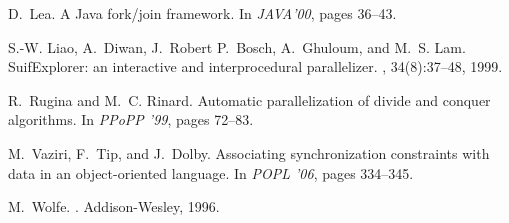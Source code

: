 \documentclass[10pt,twocolumn]{article}
\begin{document}
\begin{thebibliography}{10}
D.~Lea.
\newblock A {J}ava fork/join framework.
\newblock In {\em JAVA'00}, pages 36--43.

S.-W. Liao, A.~Diwan, J.~Robert P.~Bosch, A.~Ghuloum, and M.~S. Lam.
\newblock SuifExplorer: an interactive and interprocedural parallelizer.
, 34(8):37--48, 1999.

R.~Rugina and M.~C. Rinard.
\newblock Automatic parallelization of divide and conquer algorithms.
\newblock In {\em PPoPP '99}, pages 72--83.

M.~Vaziri, F.~Tip, and J.~Dolby.
\newblock Associating synchronization constraints with data in an
  object-oriented language.
\newblock In {\em POPL '06}, pages 334--345. 

M.~Wolfe.
.
\newblock Addison-Wesley, 1996.

\end{thebibliography}

\end{document}
